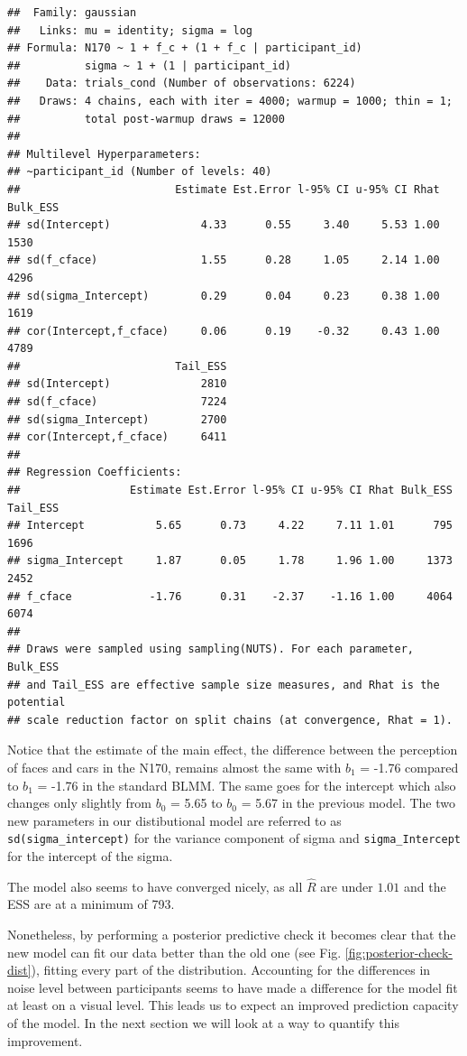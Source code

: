\documentclass[
  doc,12pt,floatsintext]{apa7}
\begin{document}
\begin{verbatim}
##  Family: gaussian 
##   Links: mu = identity; sigma = log 
## Formula: N170 ~ 1 + f_c + (1 + f_c | participant_id) 
##          sigma ~ 1 + (1 | participant_id)
##    Data: trials_cond (Number of observations: 6224) 
##   Draws: 4 chains, each with iter = 4000; warmup = 1000; thin = 1;
##          total post-warmup draws = 12000
## 
## Multilevel Hyperparameters:
## ~participant_id (Number of levels: 40) 
##                        Estimate Est.Error l-95% CI u-95% CI Rhat Bulk_ESS
## sd(Intercept)              4.33      0.55     3.40     5.53 1.00     1530
## sd(f_cface)                1.55      0.28     1.05     2.14 1.00     4296
## sd(sigma_Intercept)        0.29      0.04     0.23     0.38 1.00     1619
## cor(Intercept,f_cface)     0.06      0.19    -0.32     0.43 1.00     4789
##                        Tail_ESS
## sd(Intercept)              2810
## sd(f_cface)                7224
## sd(sigma_Intercept)        2700
## cor(Intercept,f_cface)     6411
## 
## Regression Coefficients:
##                 Estimate Est.Error l-95% CI u-95% CI Rhat Bulk_ESS Tail_ESS
## Intercept           5.65      0.73     4.22     7.11 1.01      795     1696
## sigma_Intercept     1.87      0.05     1.78     1.96 1.00     1373     2452
## f_cface            -1.76      0.31    -2.37    -1.16 1.00     4064     6074
## 
## Draws were sampled using sampling(NUTS). For each parameter, Bulk_ESS
## and Tail_ESS are effective sample size measures, and Rhat is the potential
## scale reduction factor on split chains (at convergence, Rhat = 1).
\end{verbatim}

\normalsize

Notice that the estimate of the main effect, the difference between the perception of faces and cars in the N170, remains almost the same with \(b_1\) = -1.76 compared to \(b_1\) = -1.76 in the standard BLMM. The same goes for the intercept which also changes only slightly from \(b_0\) = 5.65 to \(b_0\) = 5.67 in the previous model. The two new parameters in our distibutional model are referred to as \texttt{sd(sigma\_intercept)} for the variance component of sigma and \texttt{sigma\_Intercept} for the intercept of the sigma.

The model also seems to have converged nicely, as all \(\hat{R}\) are under \(1.01\) and the ESS are at a minimum of 793.

Nonetheless, by performing a posterior predictive check it becomes clear that the new model can fit our data better than the old one (see Fig. \ref{fig:posterior-check-dist}), fitting every part of the distribution. Accounting for the differences in noise level between participants seems to have made a difference for the model fit at least on a visual level. This leads us to expect an improved prediction capacity of the model. In the next section we will look at a way to quantify this improvement.
\end{document}
